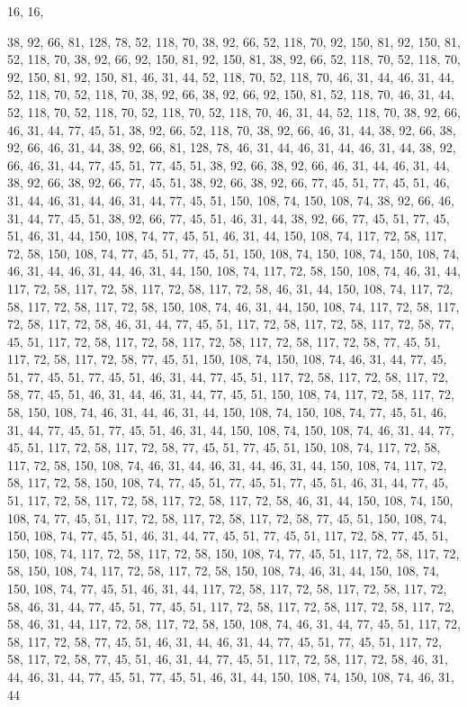 16, 16,

38, 92, 66, 81, 128, 78, 52, 118, 70, 38, 92, 66, 52, 118, 70, 92,
150, 81, 92, 150, 81, 52, 118, 70, 38, 92, 66, 92, 150, 81, 92, 150,
81, 38, 92, 66, 52, 118, 70, 52, 118, 70, 92, 150, 81, 92, 150, 81,
46, 31, 44, 52, 118, 70, 52, 118, 70, 46, 31, 44, 46, 31, 44, 52,
118, 70, 52, 118, 70, 38, 92, 66, 38, 92, 66, 92, 150, 81, 52, 118,
70, 46, 31, 44, 52, 118, 70, 52, 118, 70, 52, 118, 70, 52, 118, 70,
46, 31, 44, 52, 118, 70, 38, 92, 66, 46, 31, 44, 77, 45, 51, 38,
92, 66, 52, 118, 70, 38, 92, 66, 46, 31, 44, 38, 92, 66, 38, 92,
66, 46, 31, 44, 38, 92, 66, 81, 128, 78, 46, 31, 44, 46, 31, 44,
46, 31, 44, 38, 92, 66, 46, 31, 44, 77, 45, 51, 77, 45, 51, 38,
92, 66, 38, 92, 66, 46, 31, 44, 46, 31, 44, 38, 92, 66, 38, 92,
66, 77, 45, 51, 38, 92, 66, 38, 92, 66, 77, 45, 51, 77, 45, 51,
46, 31, 44, 46, 31, 44, 46, 31, 44, 77, 45, 51, 150, 108, 74, 150,
108, 74, 38, 92, 66, 46, 31, 44, 77, 45, 51, 38, 92, 66, 77, 45,
51, 46, 31, 44, 38, 92, 66, 77, 45, 51, 77, 45, 51, 46, 31, 44,
150, 108, 74, 77, 45, 51, 46, 31, 44, 150, 108, 74, 117, 72, 58, 117,
72, 58, 150, 108, 74, 77, 45, 51, 77, 45, 51, 150, 108, 74, 150, 108,
74, 150, 108, 74, 46, 31, 44, 46, 31, 44, 46, 31, 44, 150, 108, 74,
117, 72, 58, 150, 108, 74, 46, 31, 44, 117, 72, 58, 117, 72, 58, 117,
72, 58, 117, 72, 58, 46, 31, 44, 150, 108, 74, 117, 72, 58, 117, 72,
58, 117, 72, 58, 150, 108, 74, 46, 31, 44, 150, 108, 74, 117, 72, 58,
117, 72, 58, 117, 72, 58, 46, 31, 44, 77, 45, 51, 117, 72, 58, 117,
72, 58, 117, 72, 58, 77, 45, 51, 117, 72, 58, 117, 72, 58, 117, 72,
58, 117, 72, 58, 117, 72, 58, 77, 45, 51, 117, 72, 58, 117, 72, 58,
77, 45, 51, 150, 108, 74, 150, 108, 74, 46, 31, 44, 77, 45, 51, 77,
45, 51, 77, 45, 51, 46, 31, 44, 77, 45, 51, 117, 72, 58, 117, 72,
58, 117, 72, 58, 77, 45, 51, 46, 31, 44, 46, 31, 44, 77, 45, 51,
150, 108, 74, 117, 72, 58, 117, 72, 58, 150, 108, 74, 46, 31, 44, 46,
31, 44, 150, 108, 74, 150, 108, 74, 77, 45, 51, 46, 31, 44, 77, 45,
51, 77, 45, 51, 46, 31, 44, 150, 108, 74, 150, 108, 74, 46, 31, 44,
77, 45, 51, 117, 72, 58, 117, 72, 58, 77, 45, 51, 77, 45, 51, 150,
108, 74, 117, 72, 58, 117, 72, 58, 150, 108, 74, 46, 31, 44, 46, 31,
44, 46, 31, 44, 150, 108, 74, 117, 72, 58, 117, 72, 58, 150, 108, 74,
77, 45, 51, 77, 45, 51, 77, 45, 51, 46, 31, 44, 77, 45, 51, 117,
72, 58, 117, 72, 58, 117, 72, 58, 117, 72, 58, 46, 31, 44, 150, 108,
74, 150, 108, 74, 77, 45, 51, 117, 72, 58, 117, 72, 58, 117, 72, 58,
77, 45, 51, 150, 108, 74, 150, 108, 74, 77, 45, 51, 46, 31, 44, 77,
45, 51, 77, 45, 51, 117, 72, 58, 77, 45, 51, 150, 108, 74, 117, 72,
58, 117, 72, 58, 150, 108, 74, 77, 45, 51, 117, 72, 58, 117, 72, 58,
150, 108, 74, 117, 72, 58, 117, 72, 58, 150, 108, 74, 46, 31, 44, 150,
108, 74, 150, 108, 74, 77, 45, 51, 46, 31, 44, 117, 72, 58, 117, 72,
58, 117, 72, 58, 117, 72, 58, 46, 31, 44, 77, 45, 51, 77, 45, 51,
117, 72, 58, 117, 72, 58, 117, 72, 58, 117, 72, 58, 46, 31, 44, 117,
72, 58, 117, 72, 58, 150, 108, 74, 46, 31, 44, 77, 45, 51, 117, 72,
58, 117, 72, 58, 77, 45, 51, 46, 31, 44, 46, 31, 44, 77, 45, 51,
77, 45, 51, 117, 72, 58, 117, 72, 58, 77, 45, 51, 46, 31, 44, 77,
45, 51, 117, 72, 58, 117, 72, 58, 46, 31, 44, 46, 31, 44, 77, 45,
51, 77, 45, 51, 46, 31, 44, 150, 108, 74, 150, 108, 74, 46, 31, 44

